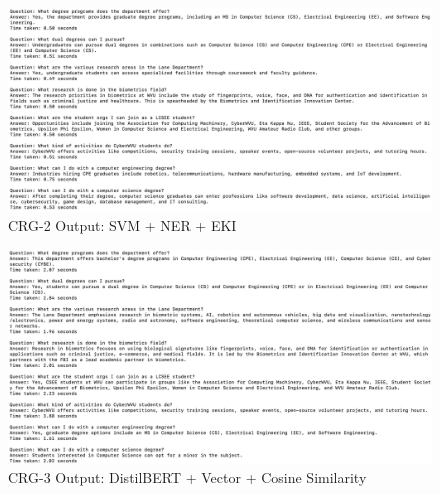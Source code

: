 \documentclass[conference]{IEEEtran}
\begin{document}
\begin{figure}[!h]
    \centering
    \includegraphics[width=\linewidth]{assets/CRG2_out.png}
    \caption{CRG-2 Output: SVM + NER + EKI}
    \label{fig:CRG_2-Out}
\end{figure}

\newpage
\begin{figure}[!h]
    \centering
    \includegraphics[width=\linewidth]{assets/CRG3_out.png}
    \caption{CRG-3 Output: DistilBERT + Vector + Cosine Similarity}
    \label{fig:CRG_3-Out}
\end{figure}
\end{document}
